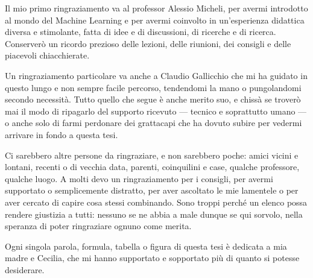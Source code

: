 Il mio primo ringraziamento va al professor Alessio Micheli, per avermi introdotto al mondo del Machine Learning e per avermi coinvolto in un'esperienza didattica diversa e stimolante, fatta di idee e di discussioni, di ricerche e di ricerca. Conserverò un ricordo prezioso delle lezioni, delle riunioni, dei consigli e delle piacevoli chiacchierate.

Un ringraziamento particolare va anche a Claudio Gallicchio che mi ha guidato in questo lungo e non sempre facile percorso, tendendomi la mano o pungolandomi secondo necessità. Tutto quello che segue è anche merito suo, e chissà se troverò mai il modo di ripagarlo del supporto ricevuto --- tecnico e soprattutto umano --- o anche solo di farmi perdonare dei grattacapi che ha dovuto subire per vedermi arrivare in fondo a questa tesi.

Ci sarebbero altre persone da ringraziare, e non sarebbero poche: amici vicini e lontani, recenti o di vecchia data, parenti, coinquilini e case, qualche professore, qualche luogo. A molti devo un ringraziamento per i consigli, per avermi supportato o semplicemente distratto, per aver ascoltato le mie lamentele o per aver cercato di capire cosa stessi combinando. Sono troppi perché un elenco possa rendere giustizia a tutti: nessuno se ne abbia a male dunque se qui sorvolo, nella speranza di poter ringraziare ognuno come merita.

Ogni singola parola, formula, tabella o figura di questa tesi è dedicata a mia madre e Cecilia, che mi hanno supportato e sopportato più di quanto si potesse desiderare.